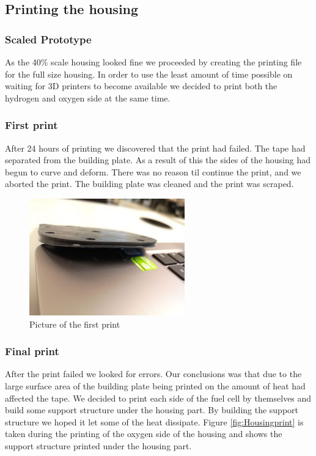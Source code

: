 \subsection{Printing the housing}

\subsubsection{Scaled Prototype}

As the 40\% scale housing looked fine we proceeded by creating the printing file for the full size housing. In order to use the least amount of time possible on waiting for 3D printers to become available we decided to print both the hydrogen and oxygen side at the same time. 

\subsubsection{First print}

After 24 hours of printing we discovered that the print had failed. The tape had separated from the building plate. As a result of this the sides of the housing had begun to curve and deform. There was no reason til continue the print, and we aborted the print. The building plate was cleaned and the print was scraped. 

\begin{figure}[ht]
    \centering
    \includegraphics[width=0.6\textwidth]{DIV./Bilder/Firstprint.jpg}
    \caption{Picture of the first print}
    \label{fig:Print1}
\end{figure}

\subsubsection{Final print}

After the print failed we looked for errors. Our conclusions was that due to the large surface area of the building plate being printed on the amount of heat had affected the tape. We decided to print each side of the fuel cell by themselves and build some support structure under the housing part. By building the support structure we hoped it let some of the heat dissipate. Figure \ref{fig:Housingprint} is taken during the printing of the oxygen side of the housing and shows the support structure printed under the housing part.

